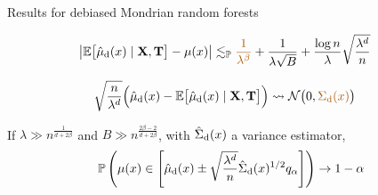 \documentclass{beamer}
\begin{document}
\begin{frame}{Results for debiased Mondrian random forests}

  \vspace*{2mm}
  \begin{beamertheorem}%
    \vspace*{-4mm}
    \begin{align*}
      \left|
      \E \big[ \hat \mu_\rd(x) \mid \bX, \bT \big]
      - \mu(x)
      \right|
      &\lesssim_\P
      \textcolor{alertcolor}{\frac{1}{\lambda^{\beta}}}
      + \frac{1}{\lambda \sqrt B}
      + \frac{\log n}{\lambda} \sqrt{\frac{\lambda^d}{n}}
    \end{align*}
    \vspace*{-5mm}
  \end{beamertheorem}

  \begin{beamertheorem}%
    \vspace*{-4mm}
    \begin{align*}
      \sqrt{\frac{n}{\lambda^d}}
      \Big(
        \hat \mu_\rd(x)
        - \E \big[ \hat \mu_\rd(x) \mid \bX, \bT \big]
      \Big)
      &\rightsquigarrow
      \cN\big(0, \textcolor{alertcolor}{\Sigma_\rd(x)}\big)
    \end{align*}
    \vspace*{-5mm}
  \end{beamertheorem}

  \begin{beamertheorem}%
    If $\lambda \gg n^{\frac{1}{d + 2 \beta}}$
    and $B \gg n^{\frac{2 \beta - 2}{d + 2 \beta}}$,
    with $\hat\Sigma_{\mathrm{d}}(x)$
    a variance estimator,
    \vspace*{-1mm}
    \begin{align*}
      \mathbb{P} \left(
        \mu(x) \in
        \left[
          \hat \mu_{\mathrm{d}}(x)
          \pm \sqrt{\frac{\lambda^d}{n}} \hat \Sigma_{\mathrm{d}}(x)^{1/2}
          q_{\alpha}
        \right]
      \right)
      \to
      1 - \alpha
    \end{align*}
    \vspace*{-3mm}
  \end{beamertheorem}

\end{frame}
\end{document}
